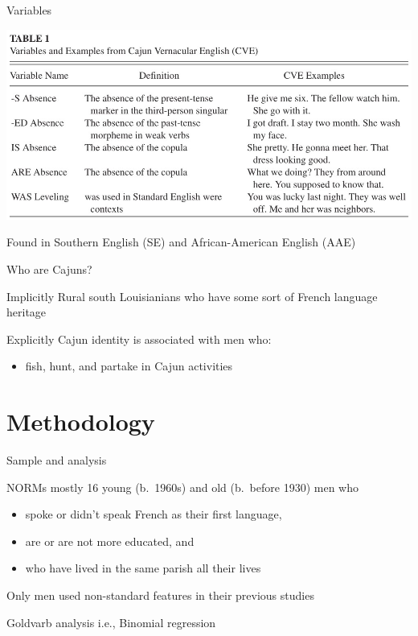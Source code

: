 \documentclass{beamer}
\begin{document}
    \begin{frame}{Variables}
      \begin{center}
        \includegraphics[scale=0.65]{variables.jpg}
      \end{center}
      \begin{block}{}
        Found in Southern English (SE) and African-American English (AAE)
      \end{block}
    \end{frame}

    \begin{frame}{Who are Cajuns?}
      \begin{block}{Implicitly}
        Rural south Louisianians who have some sort of French language heritage
      \end{block}
      \begin{block}{Explicitly}
        Cajun identity is associated with men who:
        \begin{itemize}
          \item fish, hunt, and partake in Cajun activities
        \end{itemize}
      \end{block}
    \end{frame}

  \section{Methodology}
    \begin{frame}{Sample and analysis}
      \begin{block}{NORMs mostly}
        16 young (b.~1960s) and old (b.~before 1930) men who
        \begin{itemize}
          \item spoke or didn't speak French as their first language,
          \item are or are not more educated, and
          \item who have lived in the same parish all their lives
        \end{itemize}
      \end{block}
      \begin{alertblock}{}
        Only men used non-standard features in their previous studies
      \end{alertblock}
      \begin{block}{Goldvarb analysis}
        i.e., Binomial regression
      \end{block}
    \end{frame}
\end{document}
